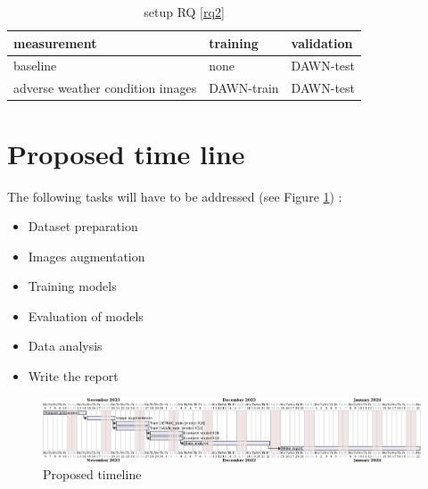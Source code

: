 \documentclass[]{article}
\begin{document}
\begin{table}[!ht]
	\begin{tabular}{lll}
		\toprule
		\textbf{measurement} & \textbf{training} & \textbf{validation} \\
		\midrule
		baseline & none & DAWN-test \\
		adverse weather condition images & DAWN-train & DAWN-test \\
		\bottomrule
	\end{tabular}
	\caption{setup RQ \ref{rq2}}
	\label{table:setuprq2}
\end{table}

\section{Proposed time line}

The following tasks will have to be addressed (see Figure \ref{fig:timeline}) :
\begin{itemize}
	\item Dataset preparation
	\item Images augmentation
	\item Training models
	\item Evaluation of models
	\item Data analysis
	\item Write the report
\end{itemize}

\begin{figure}[h]
	\centering
	\includegraphics[width=\textwidth]{proposal-timing}
	\caption{Proposed timeline}
	\label{fig:timeline}
\end{figure}

\printbibliography
\end{document}

